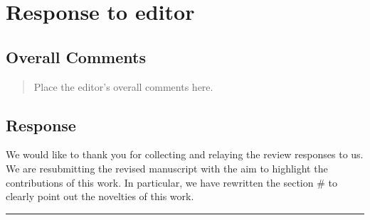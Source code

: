 \section*{Response to editor}
\subsection{Overall Comments}
\begin{mdframed}
\begin{quote}
Place the editor's overall comments here.
\end{quote}
\end{mdframed}

\subsection{Response} 
We would like to thank you for collecting and relaying the review responses to us. We are resubmitting the revised manuscript with the aim to highlight the contributions of this work. In particular, we have rewritten the section \# to clearly point out the novelties of this work. 

\noindent\rule{17cm}{6.0pt}

\newpage